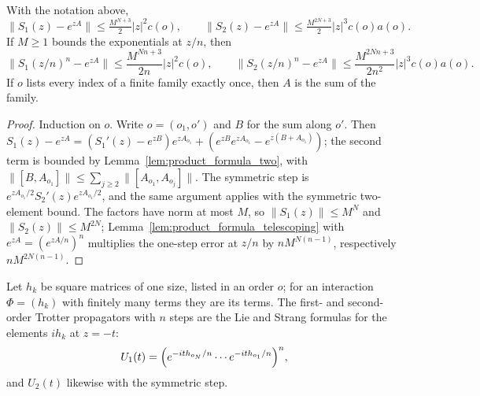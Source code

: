 \begin{theorem}
    \label{thm:product_formula}
    \leanok
    With the notation above,
    \[
        \lVert S_1(z)-e^{zA}\rVert\leq\tfrac{M^{N+3}}{2}\lvert z\rvert^2c(o),\qquad
        \lVert S_2(z)-e^{zA}\rVert\leq\tfrac{M^{2N+3}}{2}\lvert z\rvert^3c(o)a(o).
    \]
    If $M\geq1$ bounds the exponentials at $z/n$, then
    \[
        \lVert S_1(z/n)^n-e^{zA}\rVert\leq\frac{M^{Nn+3}}{2n}\lvert z\rvert^2c(o),
        \qquad
        \lVert S_2(z/n)^n-e^{zA}\rVert\leq\frac{M^{2Nn+3}}{2n^2}\lvert z\rvert^3
        c(o)a(o).
    \]
    If $o$ lists every index of a finite family exactly once, then $A$ is the
    sum of the family.
\end{theorem}
\begin{proof}\leanok
    Induction on $o$. Write $o=(o_1,o')$ and $B$ for the sum along $o'$. Then
    $S_1(z)-e^{zA}=(S_1'(z)-e^{zB})e^{zA_{o_1}}+(e^{zB}e^{zA_{o_1}}-e^{z(B+A_{o_1})})$;
    the second term is bounded by Lemma~\ref{lem:product_formula_two}, with
    $\lVert[B,A_{o_1}]\rVert\leq\sum_{j\geq2}\lVert[A_{o_1},A_{o_j}]\rVert$. The
    symmetric step is $e^{zA_{o_1}/2}S_2'(z)e^{zA_{o_1}/2}$, and the same argument
    applies with the symmetric two-element bound. The factors have norm at most
    $M$, so $\lVert S_1(z)\rVert\leq M^N$ and $\lVert S_2(z)\rVert\leq M^{2N}$;
    Lemma~\ref{lem:product_formula_telescoping} with $e^{zA}=(e^{zA/n})^n$
    multiplies the one-step error at $z/n$ by $nM^{N(n-1)}$, respectively
    $nM^{2N(n-1)}$.
\end{proof}

\begin{definition}
    \label{def:dynamics_trotter}
    \leanok
    Let $h_k$ be square matrices of one size, listed in an order $o$; for an
    interaction $\Phi=(h_k)$ with finitely many terms they are its terms. The
    first- and second-order Trotter propagators with $n$ steps are the Lie and
    Strang formulas for the elements $ih_k$ at $z=-t$:
    \[
        U_1(t)=\Bigl(e^{-ith_{o_N}/n}\cdots e^{-ith_{o_1}/n}\Bigr)^n,
    \]
    and $U_2(t)$ likewise with the symmetric step.
\end{definition}

